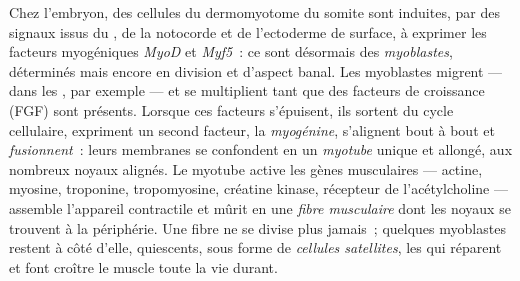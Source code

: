 \begin{definition}[La myogenèse]\label{def:b2:cell-differentiation:myogenesis}
Chez l'embryon, des cellules du dermomyotome du somite sont induites,
par des signaux issus du , de la notocorde et de l'ectoderme
de surface, à exprimer les facteurs myogéniques \emph{MyoD} et
\emph{Myf5}~: ce sont désormais des \emph{myoblastes}, déterminés mais
encore en division et d'aspect banal. Les myoblastes migrent --- dans
les , par exemple --- et se multiplient tant que des
facteurs de croissance (FGF) sont présents. Lorsque ces facteurs
s'épuisent, ils sortent du cycle cellulaire, expriment un second
facteur, la \emph{myogénine}, s'alignent bout à bout et
\emph{fusionnent}~: leurs membranes se confondent en un \emph{myotube}
unique et allongé, aux nombreux noyaux alignés. Le myotube active les
gènes musculaires --- actine, myosine, troponine, tropomyosine, créatine
kinase, récepteur de l'acétylcholine --- assemble l'appareil contractile
et mûrit en une \emph{fibre musculaire} dont les noyaux se trouvent à la
périphérie. Une fibre ne se divise plus jamais~; quelques myoblastes
restent à côté d'elle, quiescents, sous forme de \emph{cellules
satellites}, les  qui réparent et font croître le
muscle toute la vie durant.
\end{definition}

